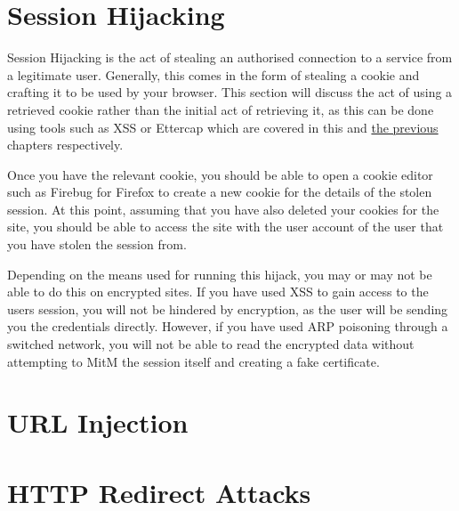 	\section{Session Hijacking}
		Session Hijacking is the act of stealing an authorised connection to a service from a legitimate user. 
		Generally, this comes in the form of stealing a cookie and crafting it to be used by your browser. 
		This section will discuss the act of using a retrieved cookie rather than the initial act of retrieving it, 
		as this can be done using tools such as XSS or Ettercap which are covered in this and \href{ch:NetworkPenetration}{the previous} chapters respectively. 

		Once you have the relevant cookie, you should be able to open a cookie editor such as Firebug for Firefox to create a new cookie for the details of the stolen session. 
		At this point, assuming that you have also deleted your cookies for the site, you should be able to access the site with the user account of the user that you have stolen the session from. 

		Depending on the means used for running this hijack, you may or may not be able to do this on encrypted sites.
		If you have used XSS to gain access to the users session, you will not be hindered by encryption, as the user will be sending you the credentials directly. 
		However, if you have used ARP poisoning through a switched network, you will not be able to read the encrypted data without attempting to MitM the session itself and creating a fake certificate. 
	\section{URL Injection}
	\section{HTTP Redirect Attacks}

